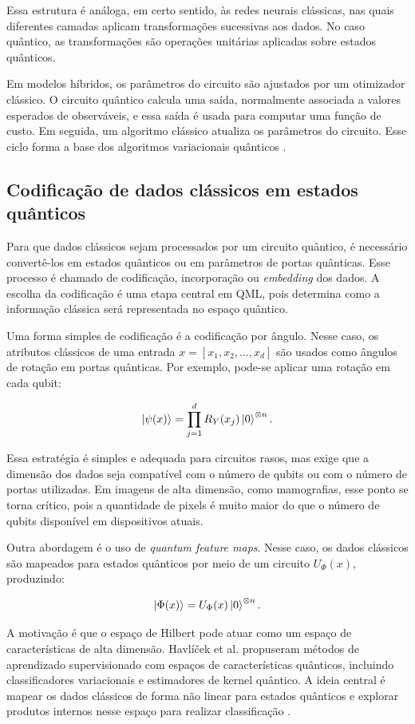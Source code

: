 \documentclass[
    12pt,
    openright,
    oneside,
    a4paper,
    english,
    brazil
]{abntex2}
\begin{document}
Essa estrutura é análoga, em certo sentido, às redes neurais clássicas, nas quais diferentes camadas aplicam transformações sucessivas aos dados. No caso quântico, as transformações são operações unitárias aplicadas sobre estados quânticos.

Em modelos híbridos, os parâmetros do circuito são ajustados por um otimizador clássico. O circuito quântico calcula uma saída, normalmente associada a valores esperados de observáveis, e essa saída é usada para computar uma função de custo. Em seguida, um algoritmo clássico atualiza os parâmetros do circuito. Esse ciclo forma a base dos algoritmos variacionais quânticos \cite{cerezo2021variational}.

\subsection{Codificação de dados clássicos em estados quânticos}

Para que dados clássicos sejam processados por um circuito quântico, é necessário convertê-los em estados quânticos ou em parâmetros de portas quânticas. Esse processo é chamado de codificação, incorporação ou \textit{embedding} dos dados. A escolha da codificação é uma etapa central em QML, pois determina como a informação clássica será representada no espaço quântico.

Uma forma simples de codificação é a codificação por ângulo. Nesse caso, os atributos clássicos de uma entrada \(x = [x_1, x_2, \ldots, x_d]\) são usados como ângulos de rotação em portas quânticas. Por exemplo, pode-se aplicar uma rotação em cada qubit:

\[
\ket{\psi(x)}
=
\prod_{j=1}^{d}
R_Y(x_j)
\ket{0}^{\otimes n}.
\]

Essa estratégia é simples e adequada para circuitos rasos, mas exige que a dimensão dos dados seja compatível com o número de qubits ou com o número de portas utilizadas. Em imagens de alta dimensão, como mamografias, esse ponto se torna crítico, pois a quantidade de pixels é muito maior do que o número de qubits disponível em dispositivos atuais.

Outra abordagem é o uso de \textit{quantum feature maps}. Nesse caso, os dados clássicos são mapeados para estados quânticos por meio de um circuito \(U_{\Phi}(x)\), produzindo:

\[
\ket{\Phi(x)} =
U_{\Phi}(x)\ket{0}^{\otimes n}.
\]

A motivação é que o espaço de Hilbert pode atuar como um espaço de características de alta dimensão. Havlíček et al. propuseram métodos de aprendizado supervisionado com espaços de características quânticos, incluindo classificadores variacionais e estimadores de kernel quântico. A ideia central é mapear os dados clássicos de forma não linear para estados quânticos e explorar produtos internos nesse espaço para realizar classificação \cite{havlicek2019supervised}.
\end{document}
